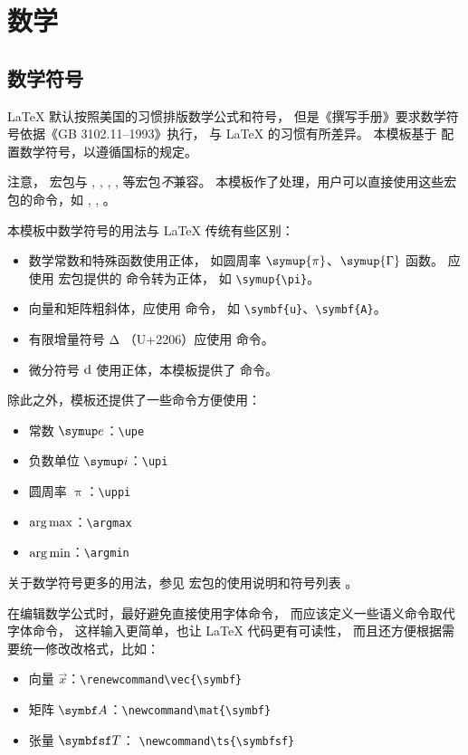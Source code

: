 
\chapter{数学}

\section{数学符号}

\LaTeX{} 默认按照美国的习惯排版数学公式和符号，
但是《撰写手册》要求数学符号依据《GB 3102.11--1993》执行，
与 \LaTeX{} 的习惯有所差异。
本模板基于  配置数学符号，以遵循国标的规定。

注意， 宏包与 , , ,
,  等宏包\emph{不}兼容。
本模板作了处理，用户可以直接使用这些宏包的命令，如 , ,
。

本模板中数学符号的用法与 \LaTeX{} 传统有些区别：
\begin{itemize}
  \item 数学常数和特殊函数使用正体，
    如圆周率 $\symup{\pi}$、$\symup{\Gamma}$ 函数。
    应使用  宏包提供的  命令转为正体，
    如 \verb|\symup{\pi}|。
  \item 向量和矩阵粗斜体，应使用  命令，
    如 \verb|\symbf{u}|、\verb|\symbf{A}|。
  \item 有限增量符号 $\increment$ （U+2206）应使用  命令。
  \item 微分符号 $\mathop{}\!\mathrm{d}$ 使用正体，本模板提供了  命令。
\end{itemize}

除此之外，模板还提供了一些命令方便使用：
\begin{itemize}
  \item 常数 $\upe$：\verb|\upe|
  \item 负数单位 $\upi$：\verb|\upi|
  \item 圆周率 $\uppi$：\verb|\uppi|
  \item $\operatorname*{arg\,max}$：\verb|\argmax|
  \item $\operatorname*{arg\,min}$：\verb|\argmin|
\end{itemize}

关于数学符号更多的用法，参见  宏包的使用说明和符号列表
。

在编辑数学公式时，最好避免直接使用字体命令，
而应该定义一些语义命令取代字体命令，
这样输入更简单，也让 \LaTeX{} 代码更有可读性，
而且还方便根据需要统一修改改格式，比如：
\begin{itemize}
  \item 向量 $\vec{x}$：\verb|\renewcommand\vec{\symbf}|
  \item 矩阵 $\mat{A}$：\verb|\newcommand\mat{\symbf}|
  \item 张量 $\ts{T}$： \verb|\newcommand\ts{\symbfsf}|
\end{itemize}

